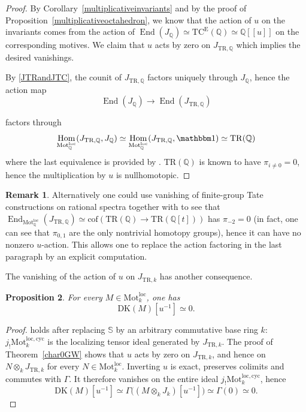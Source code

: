 \documentclass{amsart}
\theoremstyle{plain}
\newtheorem{prop}{Proposition}[section]
\theoremstyle{definition}
\newtheorem{remark}[prop]{Remark}
\newcommand{\lra}{\longrightarrow}
\newcommand{\ra}{\rightarrow}
\newcommand{\bbQ}{\mathbb{Q}}
\newcommand{\bbS}{\mathbb{S}}
\newcommand{\Motloc}{\mathrm{Mot}^{\mathrm{loc}}}
\newcommand{\Motloccyc}{\mathrm{Mot}^{\mathrm{loc},\mathrm{cyc}}}
\newcommand{\TC}{\mathrm{TC}}
\newcommand{\cof}{\mathrm{cof}}
\newcommand{\DK}{\mathrm{DK}}
\newcommand{\TR}{\mathrm{TR}}
\DeclareMathOperator{\Hom}{Hom}
\DeclareMathOperator{\End}{End}
\begin{document}
\begin{proof}
By Corollary~\ref{multiplicativeinvariants} and by the proof of Proposition~\ref{multiplicativeoctahedron}, we know that the action of $u$ on the  invariants comes from the action of $\End(J_\bbQ)\simeq \TC^{\mathrm{E}}(\bbQ)\simeq \bbQ[[u]]$ on the corresponding motives. We claim that $u$ acts by zero on $J_{\TR,\bbQ}$ which implies the desired vanishings.


By \eqref{JTRandJTC}, the counit of $J_{\TR, \bbQ}$ factors uniquely through $J_\bbQ$, hence the action map
\[\End(J_\bbQ) \lra \End(J_{\TR, \bbQ})\]

factors through 
\[
\Hom_{\Motloc_\bbQ}(J_{\TR,\bbQ},J_\bbQ)\simeq 
\Hom_{\Motloc_\bbQ}(J_{\TR,\bbQ},\mathbbm 1) \simeq \TR(\bbQ)
\]
where the last equivalence is provided by
\cite[Theorem 9.1]{Efi25b}. $\TR(\bbQ)$ is known to have $\pi_{i\ne 0}=0$, hence the multiplication by $u$ is nullhomotopic.\end{proof}

\begin{remark}
Alternatively one could use vanishing of finite-group Tate constructions on rational spectra together with \cite[Theorem 9.1]{Efi25b} to see that $\End_{\Motloc_\bbQ}(J_{\TR,\bbQ}) \simeq \cof(\TR(\bbQ) \ra \TR(\bbQ[t]))$ has $\pi_{-2}=0$ (in fact, one can see that $\pi_{0,1}$ are the only nontrivial homotopy groups), hence it can have no nonzero $u$-action. This allows one to replace the action factoring in the last paragraph by an explicit computation.
\end{remark}


The vanishing of the action of $u$ on $J_{\TR,k}$ has another consequence.

\begin{prop}
For every $M\in\Motloc_k$, one has
\[
\DK(M)[u^{-1}]\simeq0.
\]
\end{prop}

\begin{proof}
\cite[Theorem 8.1(i)]{Efi25b} holds after replacing $\bbS$ by an arbitrary commutative base ring $k$: $j_!\Motloccyc_k$ is the localizing tensor ideal generated by $J_{\TR,k}$.
The proof of Theorem~\ref{char0GW} shows that $u$ acts by zero on $J_{\TR,k}$, and hence on
$N\otimes_kJ_{\TR,k}$ for every $N\in\Motloc_k$.
Inverting $u$ is exact, preserves colimits and commutes with $\Gamma$.
It therefore vanishes on the entire ideal
$j_!\Motloccyc_k$, hence
\[
\DK(M)[u^{-1}]
\simeq
\Gamma\bigl((M\otimes_kJ_k)[u^{-1}]\bigr)\simeq\Gamma(0)
\simeq0.
\]
\end{proof}
\end{document}
